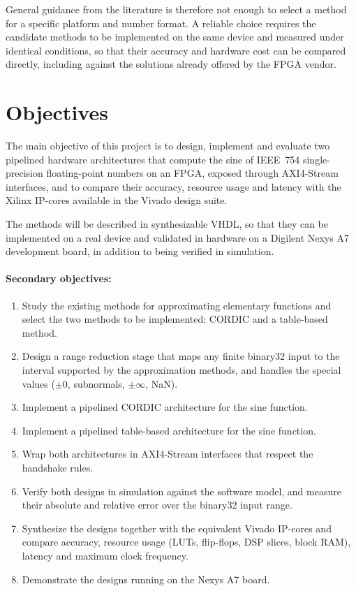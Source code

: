 General guidance from the literature is therefore not enough to select a method
for a specific platform and number format. A reliable choice requires the
candidate methods to be implemented on the same device and measured under
identical conditions, so that their accuracy and hardware cost can be compared
directly, including against the solutions already offered by the FPGA vendor.

\section{Objectives}
\label{sec:objectives}

The main objective of this project is to design, implement and evaluate two
pipelined hardware architectures that compute the sine of IEEE~754
single-precision floating-point numbers on an FPGA, exposed through AXI4-Stream
interfaces, and to compare their accuracy, resource usage and latency with the
Xilinx IP-cores available in the Vivado design suite.

The methods will be described in synthesizable VHDL, so that they can be
implemented on a real device and validated in hardware on a Digilent Nexys A7
development board, in addition to being verified in simulation.

\paragraph{Secondary objectives:}
\label{obj:secondary}
\begin{enumerate}[label=\textbf{\arabic*.}, ref=\arabic*, leftmargin=*]
  \item \label{obj:study}
    Study the existing methods for approximating elementary functions and
    select the two methods to be implemented: CORDIC and a table-based
    method.
  \item \label{obj:range}
    Design a range reduction stage that maps any finite binary32 input to
    the interval supported by the approximation methods, and handles the
    special values ($\pm 0$, subnormals, $\pm\infty$, NaN).
  \item \label{obj:cordic}
    Implement a pipelined CORDIC architecture for the sine function.
  \item \label{obj:lut}
    Implement a pipelined table-based architecture for the sine function.
  \item \label{obj:axi}
    Wrap both architectures in AXI4-Stream interfaces that respect the
    handshake rules.
  \item \label{obj:verify}
    Verify both designs in simulation against the software model, and
    measure their absolute and relative error over the binary32 input
    range.
  \item \label{obj:compare}
    Synthesize the designs together with the equivalent Vivado IP-cores
    and compare accuracy, resource usage (LUTs, flip-flops, DSP slices,
    block RAM), latency and maximum clock frequency.
  \item \label{obj:board}
    Demonstrate the designs running on the Nexys A7 board.
\end{enumerate}

